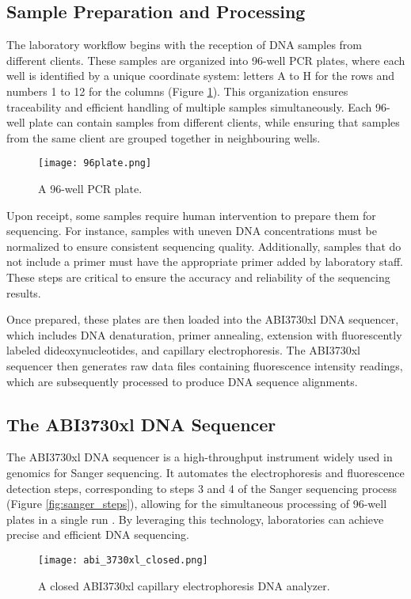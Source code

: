 \subsection{Sample Preparation and Processing}
The laboratory workflow begins with the reception of DNA samples from different clients. These samples are organized into 96-well PCR plates, where each well is identified by a unique coordinate system: letters A to H for the rows and numbers 1 to 12 for the columns (Figure \ref{fig:96_well_plate}). This organization ensures traceability and efficient handling of multiple samples simultaneously. Each 96-well plate can contain samples from different clients, while ensuring that samples from the same client are grouped together in neighbouring wells.

\begin{figure}[H]
  \centering
  \texttt{[image: 96plate.png]}
  \caption{A 96-well PCR plate.}
  \label{fig:96_well_plate}
\end{figure}

Upon receipt, some samples require human intervention to prepare them for sequencing. For instance, samples with uneven DNA concentrations must be normalized to ensure consistent sequencing quality. Additionally, samples that do not include a primer must have the appropriate primer added by laboratory staff. These steps are critical to ensure the accuracy and reliability of the sequencing results.

Once prepared, these plates are then loaded into the ABI3730xl DNA sequencer, which includes DNA denaturation, primer annealing, extension with fluorescently labeled dideoxynucleotides, and capillary electrophoresis. The ABI3730xl sequencer then generates raw data files containing fluorescence intensity readings, which are subsequently processed to produce DNA sequence alignments.


\subsection{The ABI3730xl DNA Sequencer}
The ABI3730xl DNA sequencer is a high-throughput instrument widely used in genomics for Sanger sequencing. It automates the electrophoresis and fluorescence detection steps, corresponding to steps 3 and 4 of the Sanger sequencing process (Figure \ref{fig:sanger_steps}), allowing for the simultaneous processing of 96-well plates in a single run \cite{smith_capillary_sequencing,abi3730xl_overview}. By leveraging this technology, laboratories can achieve precise and efficient DNA sequencing. 
\begin{figure}[h]
\centering
\texttt{[image: abi\_3730xl\_closed.png]}
\caption{A closed ABI3730xl capillary electrophoresis DNA analyzer.}
\label{fig:abi_3730xl_closed}
\end{figure}

